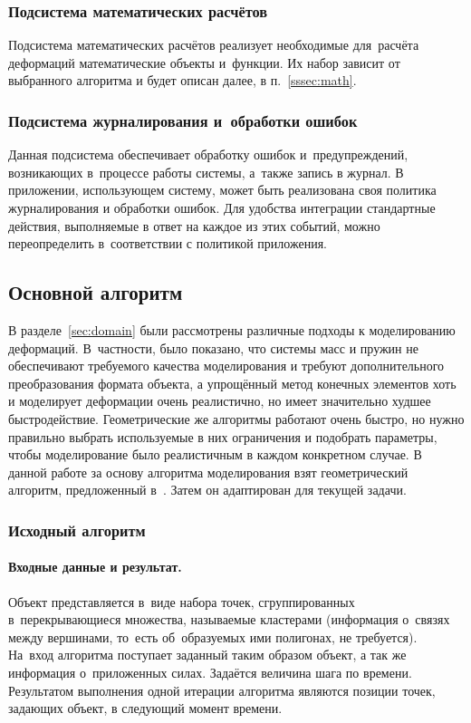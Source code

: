 \documentclass[a4paper, 14pt, titlepage]{extarticle}
\begin{document}
      \subsubsection{Подсистема математических расчётов}

        Подсистема математических расчётов реализует необходимые для~расчёта деформаций математические объекты
        и~функции. Их набор зависит от выбранного алгоритма и будет описан далее, в п.~\ref{sssec:math}.

      \subsubsection{Подсистема журналирования и~обработки ошибок}

        Данная подсистема обеспечивает обработку ошибок и~предупреждений, возникающих в~процессе
        работы системы, а~также запись в журнал. В приложении, использующем систему, может
        быть реализована своя политика журналирования и обработки ошибок. Для удобства интеграции
        стандартные действия, выполняемые в ответ на каждое из этих событий, можно переопределить
        в~соответствии с политикой приложения.

      \subsection{Основной алгоритм}\label{ssec:basic_algorithm}

      В разделе~\ref{sec:domain} были рассмотрены различные подходы к моделированию деформаций.
      В~частности, было показано, что системы масс и пружин не обеспечивают требуемого качества
      моделирования и требуют дополнительного преобразования формата объекта, а упрощённый метод конечных элементов
      хоть и моделирует деформации очень реалистично, но имеет значительно худшее быстродействие.
      Геометрические же алгоритмы работают очень быстро, но нужно правильно выбрать используемые в
      них ограничения и подобрать параметры, чтобы моделирование было реалистичным в каждом
      конкретном случае. В данной работе за основу алгоритма моделирования взят геометрический
      алгоритм, предложенный в~\cite{mueller-meshless}. Затем он адаптирован для текущей задачи.

      \subsubsection{Исходный алгоритм}

        \paragraph{Входные данные и результат.} Объект представляется в~виде набора точек,
        сгруппированных в~перекрывающиеся множества, называемые кластерами
        (информация о~связях между вершинами, то~есть об~образуемых ими полигонах, не требуется).
        На~вход алгоритма поступает заданный таким образом объект, а так же информация о~приложенных
        силах. Задаётся величина шага по времени. Результатом выполнения одной итерации алгоритма
        являются позиции точек, задающих объект, в следующий момент времени.
\end{document}
